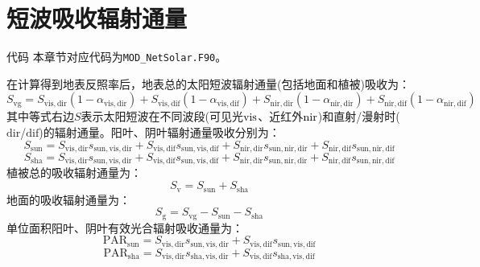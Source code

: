 \section{短波吸收辐射通量}\label{短波吸收辐射通量}
\begin{mymdframed}{代码}
  本章节对应代码为\texttt{MOD\_NetSolar.F90}。
\end{mymdframed}

在计算得到地表反照率后，地表总的太阳短波辐射通量(包括地面和植被)吸收为：
\begin{equation}
  S_{\mathrm{v g}}=S_{\mathrm{vis,dir}}\left(1-\alpha_{\mathrm{vis,dir}}\right)+S_{\mathrm{vis,dif}}\left(1-\alpha_{\mathrm{vis,dif}}\right)+
  S_{\mathrm{nir,dir}}\left(1-\alpha_{\mathrm{nir,dir}}\right)+S_{\mathrm{nir,dif}}\left(1-\alpha_{\mathrm{nir,dif}}\right)
\end{equation}
其中等式右边$S$表示太阳短波在不同波段(可见光$\rm vis$、近红外$\rm nir$)和直射/漫射时(${\mathrm {dir}}$/${\mathrm {dif}}$)的辐射通量。阳叶、阴叶辐射通量吸收分别为：
\begin{equation}
  S_{\mathrm{s u n}}=S_{\mathrm{vi s, dir}} s_{\mathrm{s u n, vi s, dir}}+S_{\mathrm{vis, dif}} s_{\mathrm{s u n, vis, dif}}+S_{\mathrm{ni r, dir}} s_{\mathrm{s u n, ni r, dir}}+S_{\mathrm{nir, dif}} s_{\mathrm{s u n, nir, dif}}
\end{equation}
\begin{equation}
  S_{\mathrm{s h a}}=S_{\mathrm{vis, dir}} s_{\mathrm{sun,vis,dir}}+S_{\mathrm{vis, dif}} s_{\mathrm{sun,vis,dif}}+S_{\mathrm{ni r, dir}} s_{\mathrm{sun,nir,dir}}+S_{\mathrm{nir, dif}} s_{\mathrm{sun,nir,dif}}
\end{equation}
植被总的吸收辐射通量为：
\begin{equation}
  S_{\mathrm{v}}=S_{\mathrm{s u n}}+S_{\mathrm{s h a}}
\end{equation}
地面的吸收辐射通量为：
\begin{equation}\label{eq:sg}
  S_{\mathrm{g}}=S_{\mathrm{v g}}-S_{\mathrm{s u n}}-S_{\mathrm{s h a}}
\end{equation}
单位面积阳叶、阴叶有效光合辐射吸收通量为：
\begin{equation}
  \text{PAR}_{\mathrm{sun}} =S_{\mathrm{vis, dir}} s_{\mathrm{sun, vis, dir}}+S_{\mathrm{vis, dif}} s_{\mathrm{sun, vis, dif}}
\end{equation}
\begin{equation}
  \text{PAR}_{\mathrm{sha}} =S_{\mathrm{vis, dir}} s_{\mathrm{sha, vis, dir}}+S_{\mathrm{vis, dif}} s_{\mathrm{sha, vis, dif}}
\end{equation}


